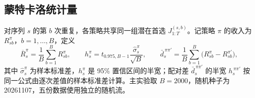 \subsection{蒙特卡洛统计量}\label{sec:mc}
对序列 $s$ 的第 $b$ 次重复，各策略共享同一组潜在首选 $J_{1:T}^{(s,b)}$。记策略 $\pi$ 的收入为 $R^{\pi}_{sb}$，$b=1,\ldots,B$，定义
\begin{equation}
\overline R_s^{\pi}=\frac1B\sum_{b=1}^{B}R^{\pi}_{sb},\qquad
h_s^{\pi}=t_{0.975,B-1}\frac{\hat\sigma_s^{\pi}}{\sqrt B},\qquad
\bar d_s^{\,\pi\pi'}=\frac1B\sum_{b=1}^{B}\bigl(R^{\pi}_{sb}-R^{\pi'}_{sb}\bigr),
\label{eq:mcstats}
\end{equation}
其中 $\hat\sigma_s^{\pi}$ 为样本标准差，$h_s^{\pi}$ 是 95\% 置信区间的半宽；配对差 $\bar d_s^{\,\pi\pi'}$ 的半宽 $h_s^{\,\pi\pi'}$ 按同一公式由逐次差值的样本标准差计算。主实验取 $B=2000$，随机种子为 20261107，五份数据使用独立的随机流。

